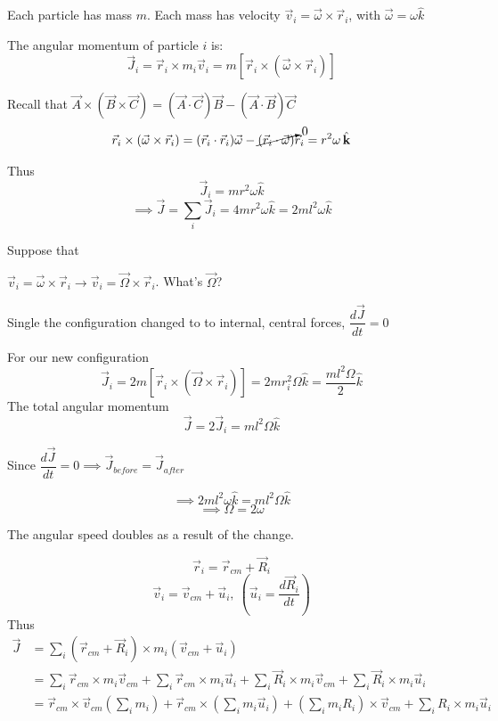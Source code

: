 \documentclass[10pt]{scrartcl}
\begin{document}
\begin{example}
\vspace*{50pt}

Each particle has mass $m$. Each mass has velocity $\vec{v}_i = \vec{\omega} \times \vec{r}_i$, with $\vec{\omega} = \omega\hat{k}$	

The angular momentum of particle $i$ is:
\[\vec{J}_i = \vec{r}_i \times m_i\vec{v}_i = m[\vec{r}_i \times (\vec{\omega} \times \vec{r}_i)]\]

Recall that $\vec{A} \times (\vec{B} \times \vec{C}) = (\vec{A}\cdot\vec{C})\vec{B} - (\vec{A}\cdot\vec{B})\vec{C}$
\[\vec{r}_i \times (\vec{\omega} \times \vec{r}_i) = (\vec{r}_i \cdot \vec{r}_i)\vec{\omega} - \cancelto{0}{(\vec{r}_i \cdot \vec{\omega})}\vec{r}_i = r^2\omega\hat{k}\]

Thus 
\[\vec{J}_i = mr^2\omega\hat{k}\]
\[\implies \vec{J} = \sum_i \vec{J}_i = 4mr^2\omega\hat{k} = 2ml^2\omega\hat{k}\]

Suppose that 
\vspace*{50pt}

$\vec{v}_i = \vec{\omega} \times \vec{r}_i \longrightarrow \vec{v}_i = \vec{\Omega} \times\vec{r}_i$. What's $\vec{\Omega}$?

Single the configuration changed to to internal, central forces, $\dfrac{d\vec{J}}{dt} = 0$

For our new configuration
\[\vec{J}_i = 2m[\vec{r}_i \times (\vec{\Omega} \times \vec{r}_i)] = 2mr_i^2\Omega\hat{k} = \frac{ml^2\Omega}{2}\hat{k}\]
The total angular momentum
\[\vec{J} = 2\vec{J}_i = ml^2\Omega\hat{k}\]

Since $\dfrac{d\vec{J}}{dt} = 0 \implies \vec{J}_{before} = \vec{J}_{after}$

\[\implies 2ml^2\omega\hat{k}= ml^2\Omega\hat{k}\]
\[\implies \Omega = 2\omega\]

The angular speed doubles as a result of the change. 
\end{example}

\pagebreak

 


\[\vec{r}_i = \vec{r}_{cm} + \vec{R}_i\]
\[\vec{v}_i = \vec{v}_{cm} + \vec{u}_i,~\left(\vec{u}_i = \frac{d\vec{R}_i}{dt}\right)\]
Thus
\[\begin{aligned}
\vec{J} &= \sum_i (\vec{r}_{cm} + \vec{R}_i) \times m_i(\vec{v}_{cm} + \vec{u}_i)\\
&= \sum_i \vec{r}_{cm} \times m_i\vec{v}_{cm} + \sum_i \vec{r}_{cm} \times m_i\vec{u}_i + \sum_i \vec{R}_i \times m_i\vec{v}_{cm} + \sum_i \vec{R}_i \times m_i\vec{u}_i\\
&= \vec{r}_{cm}\times \vec{v}_{cm}(\sum_i m_i) + \vec{r}_{cm} \times (\sum_i m_i\vec{u}_i) + (\sum_im_iR_i)\times\vec{v}_{cm} + \sum_iR_i\times m_i\vec{u}_i
\end{aligned}
\]
\end{document}
